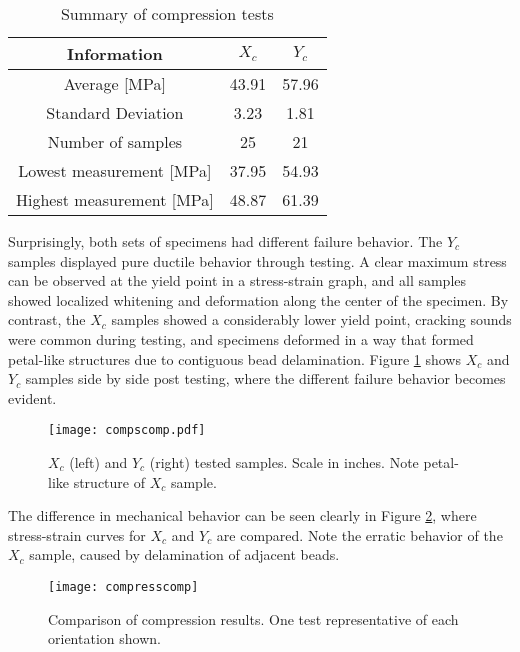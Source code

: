 \documentclass[main.tex]{subfiles}
\begin{document}
\begin{table} [h]
	\centering
	\caption{Summary of compression tests}%
	\begin{tabular}{ c| c c } 
		\toprule
		\textbf{Information} & $X_c$ & $Y_c$\\
		\midrule
		Average [MPa] &43.91  & 57.96\\
		Standard Deviation &3.23  & 1.81\\
		Number of samples &25  & 21\\
		Lowest measurement [MPa] &37.95 &54.93 \\
		Highest measurement [MPa] &48.87 &61.39 \\
		\bottomrule
	\end{tabular}
\label{tab:comprtab}
\end{table}

Surprisingly, both sets of specimens had different failure behavior. The $Y_c$ samples displayed pure ductile behavior through testing. A clear maximum stress can be observed at the yield point in a stress-strain graph, and all samples showed localized whitening and deformation along the center of the specimen. By contrast, the $X_c$ samples showed a considerably lower yield point, cracking sounds were common during testing, and specimens deformed in a way that formed petal-like structures due to contiguous bead delamination. Figure \ref{fig:CompSComp} shows $X_c$ and $Y_c$ samples side by side post testing, where the different failure behavior becomes evident.

\begin{figure}[!htbp]
	\center
	\texttt{[image: compscomp.pdf]}
	\captionsetup{justification=centering} %
	\caption[$X_c$ and $Y_c$ tested samples]{$X_c$ (left) and $Y_c$ (right) tested samples. Scale in inches. Note petal-like structure of $X_c$ sample.} \label{fig:CompSComp}
\end{figure}

The difference in mechanical behavior can be seen clearly in Figure \ref{fig:comprComp}, where stress-strain curves for $X_c$ and $Y_c$ are compared. Note the erratic behavior of the $X_c$ sample, caused by delamination of adjacent beads.  

\begin{figure}[!htbp]
	\center
	\texttt{[image: compresscomp]}
	\captionsetup{justification=centering} %
	\caption[Comparison of compression results]{Comparison of compression results. One test representative of each orientation shown.} \label{fig:comprComp}
\end{figure}  
\end{document}
